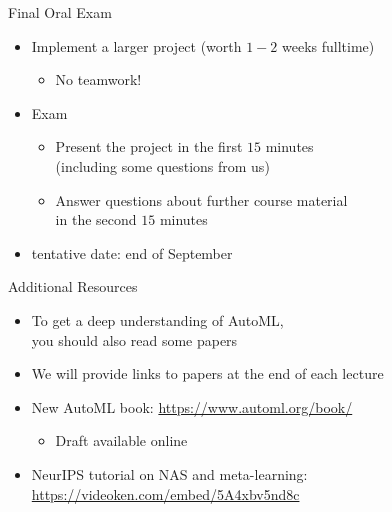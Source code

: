\begin{frame}[c]{Final Oral Exam}

\begin{itemize}
  \item Implement a larger project (worth $1-2$ weeks fulltime)
	\begin{itemize}
		\item No teamwork!
	\end{itemize}
  \item Exam
	\begin{itemize}
		\item Present the project in the first $15$ minutes\\ (including some questions from us)
		\item Answer questions about further course material\\ in the second $15$ minutes
	\end{itemize}	
  \item tentative date: end of September
\end{itemize}

\end{frame}
\begin{frame}[c]{Additional Resources}

\begin{itemize}
  \item To get a deep understanding of AutoML,\\ you should also read some papers 
  \item We will provide links to papers at the end of each lecture
  \item New AutoML book: \url{https://www.automl.org/book/}
  \begin{itemize}
    \item Draft available online
  \end{itemize}
  \item NeurIPS tutorial on NAS and meta-learning: \url{https://videoken.com/embed/5A4xbv5nd8c}
\end{itemize}

\end{frame}
